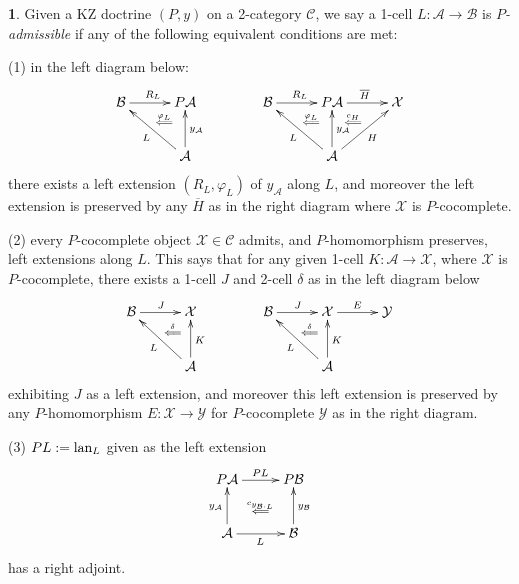 \documentclass[a4paper,oneside,english]{amsart}
\numberwithin{equation}{section}
\numberwithin{figure}{section}
\theoremstyle{plain}
\theoremstyle{definition}
\newtheorem{defn}[thm]{\protect\definitionname}
\theoremstyle{remark}
\theoremstyle{definition}
\theoremstyle{plain}
\theoremstyle{plain}
\theoremstyle{plain}
\providecommand{\definitionname}{Definition}
\begin{document}
\begin{defn}
\label{admequiv} Given a KZ doctrine $\left(P,y\right)$ on a 2-category
$\mathscr{C}$, we say a 1-cell $L\colon\mathcal{A}\to\mathcal{B}$
is \emph{$P$-admissible} if any of the following equivalent conditions
are met:

(1) in the left diagram below: 
\[
\xymatrix@=1em{\mathcal{B}\ar@{->}[rr]^{R_{L}} &  & P\mathcal{A}\ar@{}[ld]|-{\stackrel{\varphi_{L}}{\Longleftarrow}} &  &  & \mathcal{B}\ar@{->}[rr]^{R_{L}} &  & P\mathcal{A}\ar@{}[ld]|-{\stackrel{\varphi_{L}}{\Longleftarrow}}\ar[rr]^{\overline{H}}\ar@{}[rd]|-{\stackrel{c_{H}}{\Longleftarrow}} &  & \mathcal{X}\\
 & \; &  &  &  &  & \; &  & \;\\
 &  & \mathcal{A}\ar[uu]_{y_{\mathcal{A}}}\ar[ulul]^{L} &  &  &  &  & \mathcal{A}\ar[uu]_{y_{\mathcal{A}}}\ar[ulul]^{L}\ar[rruu]_{H}
}
\]
 there exists a left extension $\left(R_{L},\varphi_{L}\right)$ of
$y_{\mathcal{A}}$ along $L$, and moreover the left extension is
preserved by any $\overline{H}$ as in the right diagram where $\mathcal{X}$
is $P$-cocomplete.

(2) every $P$-cocomplete object $\mathcal{X}\in\mathscr{C}$ admits,
and $P$-homomorphism preserves, left extensions along $L$. This
says that for any given 1-cell $K:\mathcal{A}\to\mathcal{X}$, where
$\mathcal{X}$ is $P$-cocomplete, there exists a 1-cell $J$ and
2-cell $\delta$ as in the left diagram below 
\[
\xymatrix@=1em{\mathcal{B}\ar@{->}[rr]^{J} &  & \mathcal{X}\ar@{}[ld]|-{\stackrel{\delta}{\Longleftarrow}} &  &  & \mathcal{B}\ar@{->}[rr]^{J} &  & \mathcal{X}\ar@{}[ld]|-{\stackrel{\delta}{\Longleftarrow}}\ar[rr]^{E} &  & \mathcal{Y}\\
 & \; &  &  &  &  & \; &  & \;\\
 &  & \mathcal{A}\ar[uu]_{K}\ar[ulul]^{L} &  &  &  &  & \mathcal{A}\ar[uu]_{K}\ar[ulul]^{L}
}
\]
exhibiting $J$ as a left extension, and moreover this left extension
is preserved by any $P$-homomorphism $E\colon\mathcal{X}\to\mathcal{Y}$
for $P$-cocomplete $\mathcal{Y}$ as in the right diagram.

(3) $PL:=\textnormal{lan}_{L}$ given as the left extension
\[
\xymatrix@=1em{P\mathcal{A}\ar@{->}[rr]^{PL}\ar@{}[rdrd]|-{\stackrel{c_{y_{\mathcal{B}\cdot L}}}{\Longleftarrow}} &  & P\mathcal{B}\\
\\
\mathcal{A}\ar[rr]_{L}\ar[uu]^{y_{\mathcal{A}}} &  & \mathcal{B}\ar[uu]_{y_{\mathcal{B}}}
}
\]
has a right adjoint. \end{defn}
\end{document}
